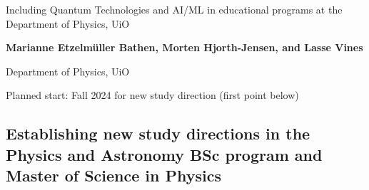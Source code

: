 \documentclass[%
oneside,                 %
final,                   %
10pt]{article}
\begin{document}

\newcommand{\exercisesection}[1]{\subsection*{#1}}






\thispagestyle{empty}

\begin{center}
{\LARGE\bf
\begin{spacing}{1.25}
Including Quantum Technologies and AI/ML in educational programs at the Department of Physics, UiO
\end{spacing}
}
\end{center}


\begin{center}
{\bf Marianne Etzelm\"uller Bathen, Morten Hjorth-Jensen, and Lasse Vines}
\end{center}

    \begin{center}
\centerline{{\small Department of Physics, UiO}}
\end{center}
    


\begin{center}
Planned start: Fall 2024 for new study direction (first point below)
\end{center}

\vspace{1cm}


\subsection*{Establishing new study directions in the Physics and Astronomy BSc program and Master of Science in Physics}


\end{document}

